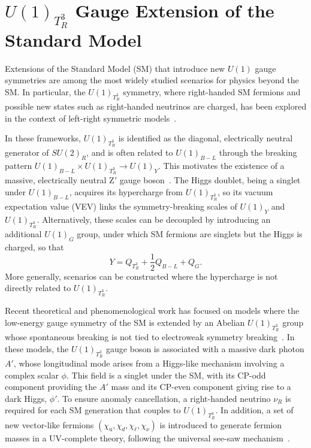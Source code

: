 
\chapter{$U(1)_{T^3_R}$ Gauge Extension of the Standard Model}

Extensions of the Standard Model (SM) that introduce new $U(1)$ gauge symmetries are among the most widely studied scenarios for physics beyond the SM. In particular, the $U(1)_{T^3_R}$ symmetry, where right-handed SM fermions and possible new states such as right-handed neutrinos are charged, has been explored in the context of left-right symmetric models~\parencite{Assad:2017iib, MohapatraPati1975, SenjanovicMohapatra1975}. 

In these frameworks, $U(1)_{T^3_R}$ is identified as the diagonal, electrically neutral generator of $SU(2)_R$, and is often related to $U(1)_{B-L}$ through the breaking pattern $U(1)_{B-L} \times U(1)_{T^3_R} \rightarrow U(1)_Y$. This motivates the existence of a massive, electrically neutral $\textrm{Z}'$ gauge boson~\parencite{DiLuzio2018, Baker2019, Michaels:2020fzj, Dev:2021otb, Florez2023}. The Higgs doublet, being a singlet under $U(1)_{B-L}$, acquires its hypercharge from $U(1)_{T^3_R}$, so its vacuum expectation value (VEV) links the symmetry-breaking scales of $U(1)_Y$ and $U(1)_{T^3_R}$. Alternatively, these scales can be decoupled by introducing an additional $U(1)_G$ group, under which SM fermions are singlets but the Higgs is charged, so that~\parencite{Dutta:2022qvn}
\begin{equation}
Y=Q_{T^3_R}+\frac{1}{2}Q_{B-L} + Q_G.
\end{equation}
More generally, scenarios can be constructed where the hypercharge is not directly related to $U(1)_{T^3_R}$.

Recent theoretical and phenomenological work has focused on models where the low-energy gauge symmetry of the SM is extended by an Abelian $U(1)_{T^3_R}$ group whose spontaneous breaking is not tied to electroweak symmetry breaking~\parencite{Dutta2019, Dutta2020, Dutta2020b, Dutta2022, PhysRevD.107.095019, Dutta2023}. In these models, the $U(1)_{T^3_R}$ gauge boson is associated with a massive dark photon $A'$, whose longitudinal mode arises from a Higgs-like mechanism involving a complex scalar $\phi$. This field is a singlet under the SM, with its CP-odd component providing the $A'$ mass and its CP-even component giving rise to a dark Higgs, $\phi'$. To ensure anomaly cancellation, a right-handed neutrino $\nu_R$ is required for each SM generation that couples to $U(1)_{T^3_R}$. In addition, a set of new vector-like fermions $(\chi_\mathrm{u}, \chi_d, \chi_\ell, \chi_\nu)$ is introduced to generate fermion masses in a UV-complete theory, following the universal see-saw mechanism~\parencite{Berezhiani, Chang1987, Davidson1987, Rajpoot1987, Babu1989, Babu1990}.

